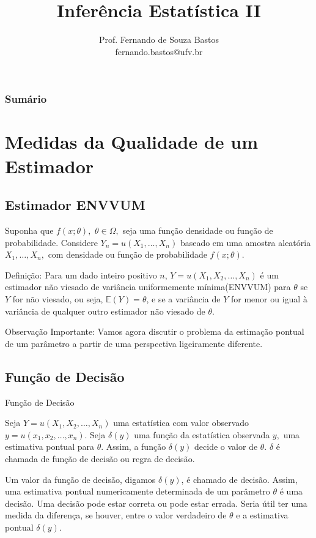 \documentclass[12pt]{beamer}
\title{Inferência Estatística II}
\author{Prof. Fernando de Souza Bastos\texorpdfstring{\\ fernando.bastos@ufv.br}{}}
\institute{Departamento de Estatística\texorpdfstring{\\ Programa de Pós-Graduação em Estatística Aplicada e Biometria}\texorpdfstring{\\ Universidade Federal de Viçosa}{}\texorpdfstring{\\ Campus UFV - Viçosa}{}}
\date{}
\begin{document}

\frame{\titlepage}

\begin{frame}{}
\frametitle{\bf Sumário}
\tableofcontents
\end{frame}
\section{Medidas da Qualidade de um Estimador}
\subsection{Estimador ENVVUM}
\begin{frame}{}
\begin{block}{}
\justifying
Suponha que $f(x; \theta),$ $\theta \in \Omega,$ seja uma função densidade ou função de probabilidade. Considere $Y_n = u(X_1, \ldots, X_n)$ baseado em uma amostra aleatória $X_1, \ldots, X_n,$ com densidade ou função de probabilidade $f(x; \theta).$
\end{block}
\pause
\begin{block}{Definição:}
\justifying
Para um dado inteiro positivo $n$, $Y = u(X_1,X_2, \ldots, X_n)$ é um estimador não viesado de variância uniformemente mínima(ENVVUM) para $\theta$ se $Y$ for não viesado, ou seja, $\mathbb{E}(Y) = \theta$, e se a variância de $Y$ for menor ou igual à variância de qualquer outro estimador não viesado de $\theta$.
\end{block}
\end{frame}

\begin{frame}{}
\begin{block}{Observação Importante:}
\justifying
Vamos agora discutir o problema da estimação pontual de um parâmetro a partir de uma perspectiva ligeiramente diferente.
\end{block}
\end{frame}

\subsection{Função de Decisão}
\begin{frame}{Função de Decisão}
\begin{block}{}
\justifying
Seja $Y = u(X_1,X_2, \ldots, X_n)$ uma estatística com valor observado $y = u(x_1,x_2, \ldots, x_n)$. Seja $\delta(y)$ uma função da estatística observada $y,$ uma estimativa pontual para $\theta$. Assim, a função $\delta(y)$ decide o valor de $\theta.$  $\delta$ é chamada de função de decisão ou regra de decisão.
\end{block}
\pause
\begin{block}{}
\justifying
Um valor da função de decisão, digamos $\delta(y)$, é chamado de decisão. Assim, uma estimativa pontual numericamente determinada de um parâmetro $\theta$ é uma decisão. Uma decisão pode estar correta ou pode estar errada. Seria útil ter uma medida da diferença, se houver, entre o valor verdadeiro de $\theta$ e a estimativa pontual $\delta(y)$.
\end{block}
\end{frame}
\end{document}

